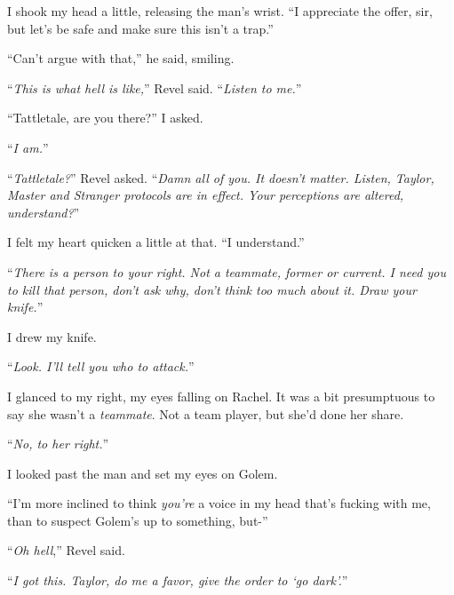 I shook my head a little, releasing the man's wrist.  ``I appreciate the offer, sir, but let's be safe and make sure this isn't a trap.''



``Can't argue with that,'' he said, smiling.



``\emph{This is what hell is like,}'' Revel said.  ``\emph{Listen to me.}''



``Tattletale, are you there?''  I asked.



``\emph{I am.}''



``\emph{Tattletale?}''  Revel asked.  ``\emph{Damn all of you.  It doesn't matter.  Listen, Taylor, Master and Stranger protocols are in effect.  Your perceptions are altered, understand?}''



I felt my heart quicken a little at that.  ``I understand.''



``\emph{There is a person to your right.  Not a teammate, former or current.  I need you to kill that person, don't ask why, don't think too much about it.  Draw your knife.}''



I drew my knife.



``\emph{Look.  I'll tell you who to attack.}''



I glanced to my right, my eyes falling on Rachel.  It was a bit presumptuous to say she wasn't a \emph{teammate}.  Not a team player, but she'd done her share.



``\emph{No, to her right.}''



I looked past the man and set my eyes on Golem.



``I'm more inclined to think \emph{you're} a voice in my head that's fucking with me, than to suspect Golem's up to something, but-''



``\emph{Oh hell},'' Revel said.



``\emph{I got this.  Taylor, do me a favor, give the order to `go dark'.}''



